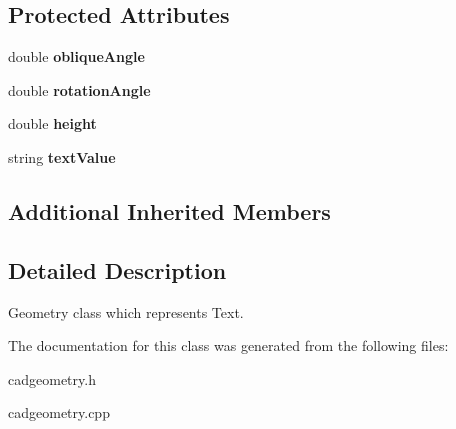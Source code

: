 \subsection*{Protected Attributes}
\begin{DoxyCompactItemize}
\item 
double {\bfseries oblique\+Angle}\hypertarget{class_c_a_d_text_a8c58daa962ea19d9d9d7a6febb6af661}{}\label{class_c_a_d_text_a8c58daa962ea19d9d9d7a6febb6af661}

\item 
double {\bfseries rotation\+Angle}\hypertarget{class_c_a_d_text_ad7f1d1413f0027849e06ca9d7ae6912e}{}\label{class_c_a_d_text_ad7f1d1413f0027849e06ca9d7ae6912e}

\item 
double {\bfseries height}\hypertarget{class_c_a_d_text_ae714f0e81916b396509f0f568c2d6e4b}{}\label{class_c_a_d_text_ae714f0e81916b396509f0f568c2d6e4b}

\item 
string {\bfseries text\+Value}\hypertarget{class_c_a_d_text_aab3ce20d3a4ee8952d9fe12092194f56}{}\label{class_c_a_d_text_aab3ce20d3a4ee8952d9fe12092194f56}

\end{DoxyCompactItemize}
\subsection*{Additional Inherited Members}


\subsection{Detailed Description}
Geometry class which represents Text. 

The documentation for this class was generated from the following files\+:\begin{DoxyCompactItemize}
\item 
cadgeometry.\+h\item 
cadgeometry.\+cpp\end{DoxyCompactItemize}
